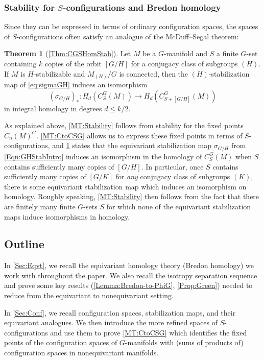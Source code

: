 \documentclass[11pt]{amsart}
\theoremstyle{definition}
\numberwithin{equation}{subsection} %
\newtheorem{thmx}{Theorem}
\begin{document}
\subsubsection{Stability for $S$-configurations and Bredon homology}

Since they can be expressed in terms of ordinary configuration spaces, the spaces of $S$-configurations often satisfy an analogue of the McDuff--Segal theorem:

\begin{thmx}[{\cref{Thm:CGSHomStab}}]\label{MT:CSGStability}
Let $M$ be a $G$-manifold and $S$ a finite $G$-set containing $k$
copies of the orbit
$[G/H]$ for a conjugacy class of subgroups $(H)$. If $M$ is $H$-stabilizable and
$M_{(H)}/G$ is connected, then the $(H)$-stabilization map of \eqref{eq:sigmaGH} induces an isomorphism
$$ (\sigma_{G/H})_*: H_d(C^G_S(M)) \to H_d(C^G_{S+[G/H]}(M)) $$
in integral homology in degrees $d\leq k/2$.
\end{thmx}

As explained above, \cref{MT:Stability} follows from stability for the fixed points $C_n(M)^G$. \cref{MT:CtoCSG} allows us to express these fixed points in terms of $S$-configurations, and \cref{MT:CSGStability} states that the equivariant stabilization map $\sigma_{G/H}$ from \eqref{Eqn:GHStabIntro} induces an isomorphism in the homology of $C_S^G(M)$ when $S$ contains sufficiently many copies of $[G/H]$. In particular, once $S$ contains sufficiently many copies of $[G/K]$ for \emph{any} conjugacy class of subgroups $(K)$, there is some equivariant stabilization map which induces an isomorphism on homology. Roughly speaking, \cref{MT:Stability} then follows from the fact that there are finitely many finite $G$-sets $S$ for which none of the equivariant stabilization maps induce isomorphisms in homology. 

\subsection{Outline}

In \cref{Sec:Eqvt}, we recall the equivariant homology theory (Bredon homology) we work with throughout the paper. We also recall the isotropy separation sequence and prove some key results (\cref{Lemma:Bredon-to-PhiG}, \cref{Prop:Green}) needed to reduce from the equivariant to nonequivariant setting. 

In \cref{Sec:Conf}, we recall configuration spaces, stabilization maps, and their equivariant analogues. We then introduce the more refined spaces of $S$-configurations and use them to prove \cref{MT:CtoCSG} which identifies the fixed points of the configuration spaces of $G$-manifolds with (sums of products of) configuration spaces in nonequivariant manifolds. 
\end{document}
